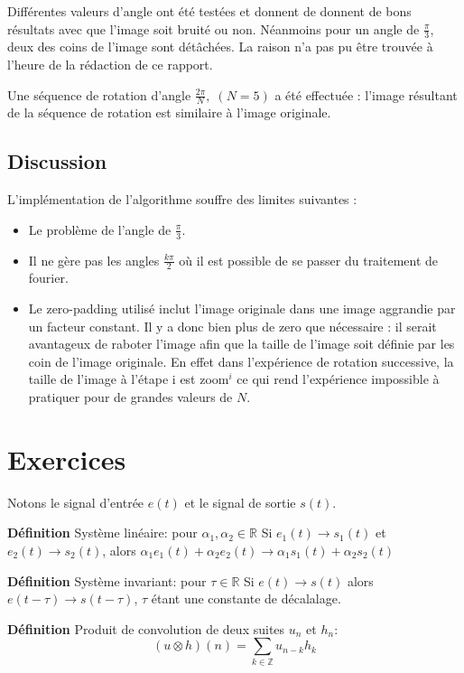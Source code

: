 \documentclass[12pt]{article}
\begin{document}
Différentes valeurs d'angle ont été testées et donnent de donnent de bons résultats avec que l'image soit bruité ou non. Néanmoins pour un angle de $\frac{\pi}{3}$, deux des coins de l'image sont détâchées. La raison n'a pas pu être trouvée à l'heure de la rédaction de ce rapport. 

Une séquence de rotation d'angle $\frac{2\pi}{N}, \;(N = 5) $ a été effectuée : l'image résultant de la séquence de rotation est similaire à l'image originale. 

\subsection*{Discussion}
L'implémentation de l'algorithme souffre des limites suivantes : 
\begin{itemize}
\item Le problème de l'angle de $\frac{\pi}{3}$.
\item Il ne gère pas les angles $\frac{k\pi}{2}$ où il est possible de se passer du traitement de fourier.
\item Le zero-padding utilisé  inclut l'image originale dans une image aggrandie par un facteur constant. Il y a donc bien plus de zero que nécessaire : il serait avantageux de raboter l'image afin que la taille de l'image soit définie par les coin de l'image originale. En effet dans l'expérience de rotation successive, la taille de l'image à l'étape i est zoom$^i$ ce qui rend l'expérience impossible à pratiquer pour de grandes valeurs de $N$.
\end{itemize}
\section{Exercices}

Notons le signal d'entrée $e(t)$ et le signal de sortie $s(t)$.


\textbf{Définition} Système linéaire: pour $\alpha_1, \alpha_2 \in \mathbb{R}$\newline
Si $e_1(t) \rightarrow s_1(t)$ et $e_2(t) \rightarrow s_2(t)$, alors $\alpha_1 e_1(t) + \alpha_2 e_2(t) \rightarrow \alpha_1 s_1(t) + \alpha_2 s_2(t)$

\textbf{Définition} Système invariant: pour $\tau \in \mathbb{R}$ \newline
Si $e(t) \rightarrow s(t)$ alors $e(t-\tau) \rightarrow s(t-\tau)$, $\tau$ étant une constante de décalalage.

\textbf{Définition} Produit de convolution de deux suites $u_n$ et $h_n$: \newline
$$ (u \otimes h)(n) = \sum_{k \in \mathbb{Z}} u_{n-k}h_k $$
\end{document}
